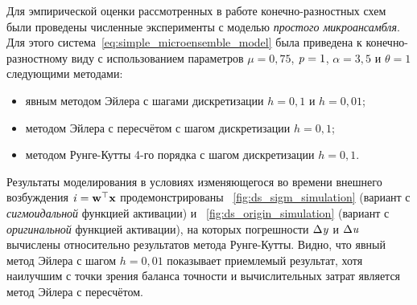 \newpage

Для эмпирической оценки рассмотренных в работе конечно-разностных схем были проведены численные эксперименты с моделью \textit{простого микроансамбля}. Для этого система~\eqref{eq:simple_microensemble_model} была приведена к конечно-разностному виду с использованием параметров $\mu = 0,75$, $\mathit{p} = 1$, $\alpha = 3,5$ и $\theta = 1$ следующими методами:
\begin{itemize}
    \item явным методом Эйлера с шагами дискретизации $h=0,1$ и $h=0,01$;
    \item методом Эйлера с пересчётом с шагом дискретизации $h=0,1$;
    \item методом Рунге-Кутты 4-го порядка с шагом дискретизации $h=0,1$.
\end{itemize}

Результаты моделирования в условиях изменяющегося во времени внешнего возбуждения $\mathit{i} = \mathrm{\mathbf{w}}^{\top} \mathrm{\mathbf{x}}$ продемонстрированы \onfigure~\ref{fig:ds_sigm_simulation} (вариант с \textit{сигмоидальной} функцией активации) и \onfigure~\ref{fig:ds_origin_simulation} (вариант с \textit{оригинальной} функцией активации), на которых погрешности $\Delta\mathit{y}$ и $\Delta\mathit{u}$ вычислены относительно результатов метода Рунге-Кутты. Видно, что явный метод Эйлера с шагом $h=0,01$ показывает приемлемый результат, хотя наилучшим с точки зрения баланса точности и вычислительных затрат является метод Эйлера с пересчётом.



